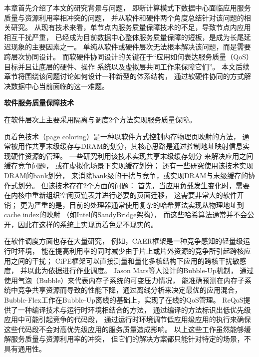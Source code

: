 本章首先介绍了本文的研究背景与问题，
即新计算模式下数据中心面临应用服务质量与资源利用率相冲突的问题，
并从软件和硬件两个角度总结针对该问题的相关研究。
从现有技术来看，单节点内服务质量保障技术的不足，导致节点内应用相互干扰严重，
已经成为目前数据中心整体服务质量保障的短板，是成为长尾延迟现象的主要因素之一。
单纯从软件或硬件层次无法根本解决该问题，而是需要跨层次协同设计。
而软硬件协同设计的关键在于``应用如何表达服务质量（QoS）目标并且让底层的硬件、操作
系统以及虚拟层共同工作来保障它们''\cite{21st_architecture}。
本文后续章节将围绕该问题讨论如何设计一种新型的体系结构，
通过软硬件协同的方式解决数据中心当前面临的这一难题。


\iffalse

\textbf{软件服务质量保障技术}\quad

在软件层次上主要采用隔离与调度2个方法实现服务质量保障。

%
%

页着色技术（page coloring）是一种以软件方式控制内存物理页映射的方法，
通常被用作共享末级缓存与DRAM的划分，其核心思路是通过控制地址映射信息实现硬件资源的管理。
一些研究利用该技术实现共享末级缓存划分\cite{lin_gaining_2008, tam_managing_2007}
来解决应用之间缓存竞争问题，
或在虚拟化场景下实现缓存划分\cite{Jin2009, Chen2010, Wang2012}；
还有一些研究\cite{liu_software_2012}使用该技术实现DRAM的bank划分，
来消除bank级的干扰与竞争，或实现DRAM与末级缓存的协作式划分\cite{Liu:2014:ISCA}。
但该技术存在2个方面的问题：
首先，当应用负载发生变化时，需要在内核中重新组织空闲页链表并进行必要的页面迁移，
这需要非常大的软件开销；
更为严重的是，目前的处理器通常使用复杂的哈希算法实现从物理地址到cache index的映射
（如Intel的SandyBridge架构），
而这些哈希算法通常并不会公开，因此在这样的系统上实现页着色是不现实的。

在软件调度方面也存在大量研究，
例如，CAER框架\cite{mars_contention_2010}是一种竞争感知的轻量级运行时环境，
能在提高利用率的同时减少由于片上或片外资源的竞争所引起跨核应用之间的干扰；
CiPE框架\cite{mars_directly_2011}可以直接测量和量化多核结构下应用的跨核干扰敏感度，
并以此为依据进行作业调度。
Jason Mars等人设计的Bubble-Up\cite{mars_bubble-up:_2011}机制，
通过使用气泡（Bubble）来代表内存子系统的可变压力情况，
能准确预测在内存子系统中竞争共享资源而导致的性能下降，通过离线分析来决定最优的应用混合，
Bubble-Flex\cite{yang_bubble-flux:_2013}工作在Bubble-Up离线的基础上，实现了在线的QoS管理。
ReQoS\cite{tang_reqos:_2013}提供了一种编译技术与运行时环境相结合的方法，
通过编译的方法标识出低优先级应用中可能引起竞争的代码段，
通过运行时环境调节低应用级应用的执行来确保这些代码段不会对高优先级应用的服务质量造成影响。
以上这些工作虽然能够缓解服务质量与资源利用率的冲突，
但它们的解决方案都只能针对特定的场景，不具有通用性。


